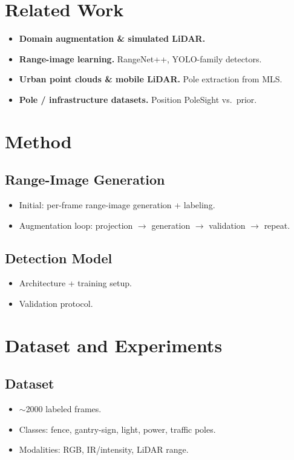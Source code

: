 \section{Related Work}
\label{sec:related}
\begin{itemize}
    \item \textbf{Domain augmentation \& simulated LiDAR.} %
    \item \textbf{Range-image learning.} RangeNet++, YOLO-family detectors. %
    \item \textbf{Urban point clouds \& mobile LiDAR.} Pole extraction from MLS. %
    \item \textbf{Pole / infrastructure datasets.} Position PoleSight vs.\ prior. %
\end{itemize}

\section{Method}
\label{sec:method}

\subsection{Range-Image Generation}
\begin{itemize}
    \item Initial: per-frame range-image generation + labeling.
    \item Augmentation loop: projection $\rightarrow$ generation $\rightarrow$
        validation $\rightarrow$ repeat.
\end{itemize}

\subsection{Detection Model}
\begin{itemize}
    \item Architecture + training setup.
    \item Validation protocol.
\end{itemize}

\section{Dataset and Experiments}
\label{sec:dataset}

\subsection{Dataset}
\begin{itemize}
    \item $\sim$2000 labeled frames.
    \item Classes: fence, gantry-sign, light, power, traffic poles.
    \item Modalities: RGB, IR/intensity, LiDAR range.
\end{itemize}

